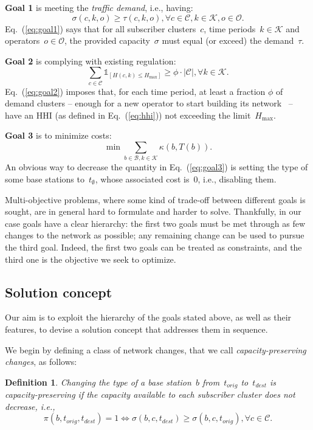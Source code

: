 \documentclass[10pt,journal,cspaper,compsoc]{IEEEtran}
\newcommand{\indicator}[1]{\mathds{1}_{\left[ {#1} \right] }}
\newcommand{\Eq}[1]{Eq.~(\ref{eq:#1})}
\newtheorem{definition}{Definition}
\newcommand{\Oc}{\mathcal{O}}
\newcommand{\Bc}{\mathcal{B}}
\newcommand{\Cc}{\mathcal{C}}
\newcommand{\Kc}{\mathcal{K}}
\begin{document}
{\bf Goal 1} is meeting the {\em traffic demand}, i.e., having:
\begin{equation}
\label{eq:goal1}
\sigma(c,k,o)\geq\tau(c,k,o),\forall c\in\Cc,k\in\Kc,o\in\Oc.
\end{equation}
\Eq{goal1} says that for all subscriber clusters~$c$, time periods~$k\in\Kc$ and operators~$o\in\Oc$, the
provided capacity~$\sigma$
must equal (or exceed) the demand~$\tau$.

{\bf Goal 2} is complying with existing regulation:
\begin{equation}
\label{eq:goal2}
\sum_{c\in\Cc}\indicator{H(c,k)\leq H_{\max}}\geq \phi \cdot|\Cc|,\forall k\in\Kc.
\end{equation}
\Eq{goal2} imposes that, for each time period, at least a fraction $\phi$ of demand clusters
-- enough for a new operator to start building its network~\cite{vodafone-merger,pakistan} --
have an HHI (as defined in \Eq{hhi}) not exceeding the limit~$H_{\max}$.

{\bf Goal 3} is to minimize costs:
\begin{equation}
\label{eq:goal3}
\min \sum_{b\in\Bc,k\in\Kc} \kappa(b,T(b)).
\end{equation}
An obvious way to decrease the quantity in \Eq{goal3} is setting the type of some base stations to~$t_\emptyset$,
whose associated cost is~$0$, i.e., disabling them.

Multi-objective problems,
where some kind of trade-off between different goals is sought, are in general hard to formulate and harder to solve.
Thankfully, in our case goals have a clear hierarchy: the first two goals must be met through as few
changes to the network as possible; any remaining change can be used to pursue the third goal.
Indeed, the first two goals can be treated as constraints, and the third one is the objective we seek to optimize.

\subsection{Solution concept}

Our aim is to exploit the hierarchy of the goals stated above, as well as their features, to devise a
solution concept that addresses them in sequence.

We begin by defining a class of network changes, that we call {\em capacity-preserving changes}, as follows:
\begin{definition}
Changing the type of a base station~$b$ from~$t_{orig}$ to~$t_{dest}$ is {\em capacity-preserving} if
the capacity available to each subscriber cluster does not decrease, i.e.,
\begin{equation}
\label{eq:preserve}
\pi(b,t_{orig},t_{dest})=1 \Leftrightarrow \sigma(b,c,t_{dest})\geq\sigma(b,c,t_{orig}), \forall c\in\Cc.
\end{equation}
\end{definition}
\end{document}
